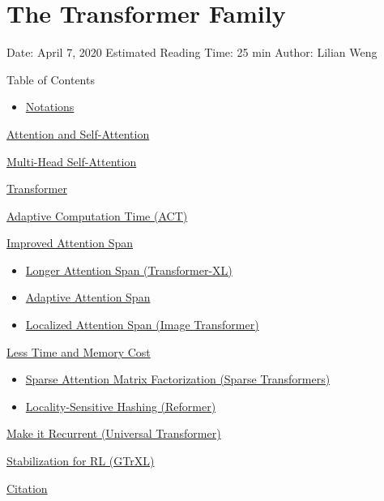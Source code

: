 \section{The Transformer Family}\label{the-transformer-family}

Date: April 7, 2020 \textbar{} Estimated Reading Time: 25 min \textbar{} Author: Lilian Weng

{Table of Contents}

\begin{itemize}
\tightlist
\item
  \hyperref[notations]{Notations}
\end{itemize}

\hyperref[attention-and-self-attention]{Attention and Self-Attention}

\hyperref[multi-head-self-attention]{Multi-Head Self-Attention}

\hyperref[transformer]{Transformer}

\hyperref[adaptive-computation-time-act]{Adaptive Computation Time (ACT)}

\hyperref[improved-attention-span]{Improved Attention Span}

\begin{itemize}
\tightlist
\item
  \hyperref[longer-attention-span-transformer-xl]{Longer Attention Span (Transformer-XL)}
\item
  \hyperref[adaptive-attention-span]{Adaptive Attention Span}
\item
  \hyperref[localized-attention-span-image-transformer]{Localized Attention Span (Image Transformer)}
\end{itemize}

\hyperref[less-time-and-memory-cost]{Less Time and Memory Cost}

\begin{itemize}
\tightlist
\item
  \hyperref[sparse-attention-matrix-factorization-sparse-transformers]{Sparse Attention Matrix Factorization (Sparse Transformers)}
\item
  \hyperref[locality-sensitive-hashing-reformer]{Locality-Sensitive Hashing (Reformer)}
\end{itemize}

\hyperref[make-it-recurrent-universal-transformer]{Make it Recurrent (Universal Transformer)}

\hyperref[stabilization-for-rl-gtrxl]{Stabilization for RL (GTrXL)}

\hyperref[citation]{Citation}

